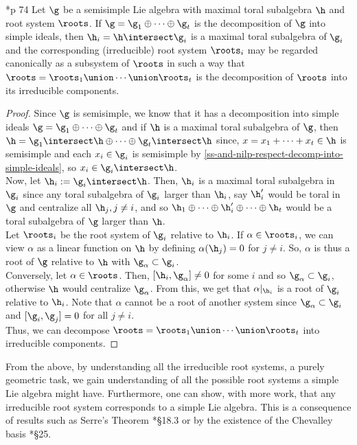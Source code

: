 \documentclass[11pt,leqno,oneside]{amsart}
\numberwithin{thm}{section}
\begin{document}
\begin{cor}
  \cite{humph}*{p 74} Let \(\g\) be a semisimple Lie algebra with
  maximal toral subalgebra 
  \(\h\) and root system \(\roots\). If \(\g = \g_1 \oplus \cdots
  \oplus \g_t\) is the decomposition of \(\g\) into simple ideals,
  then \(\h_i = \h \intersect \g_i\) is a maximal toral subalgebra of
  \(\g_i\) and the corresponding (irreducible) root system
  \(\roots_i\) may be regarded canonically as a subsystem of
  \(\roots\) in such a way that \(\roots = \roots_1 \union \cdots
  \union \roots_t\) is the decomposition of \(\roots\) into its
  irreducible components.
\end{cor}
\begin{proof}
  Since \(\g\) is semisimple, we know that it has a decomposition into
  simple ideals \(\g = \g_1 \oplus \cdots \oplus \g_t\) and if \(\h\)
  is a maximal toral subalgebra of \(\g\), then \(\h = \g_1
  \intersect \h \oplus \cdots \oplus \g_t \intersect \h\) since, \(x =
  x_1 + \cdots + x_t \in \h\) is 
  semisimple and each \(x_i \in \g_i\) is semisimple by \ref{ss-and-nilp-respect-decomp-into-simple-ideals}, so
  \(x_i \in \g_i \intersect \h\). \\

  Now, let \(\h_i := \g_i \intersect \h\). Then, \(\h_i\) is a maximal
  toral subalgebra in \(\g_i\) since any toral subalgebra of \(\g_i\)
  larger than \(\h_i\), say \(\h_i'\) would be toral in \(\g\) and
  centralize all 
  \(\h_j, j \neq i\), and so \(\h_1 \oplus \cdots \oplus \h_i' \oplus
  \cdots \oplus \h_t\) would be a toral subalgebra of \(\g\) larger
  than \(\h\). \\

  Let \(\roots_i\) be the root system of \(\g_i\) relative to
  \(\h_i\). If \(\alpha \in \roots_i\), we can view \(\alpha\) as a
  linear function on \(\h\) by defining \(\alpha(\h_j) = 0\) for \(j
  \neq i\). So, \(\alpha\) is thus a root of \(\g\) relative to \(\h\)
  with \(\g_\alpha \subset \g_i\). \\

  Conversely, let \(\alpha \in
  \roots\). Then, \([\h_i, \g_\alpha] \neq 0\) for some \(i\) and so
  \(\g_\alpha \subset \g_i\), otherwise \(\h\) would centralize
  \(\g_\alpha\). From this, we get that 
  \(\alpha|_{\h_i}\) is a root of \(\g_i\) relative to
  \(\h_i\). Note that \(\alpha\) cannot be a root of another system
  since \(\g_\alpha \subset \g_i\) and \([\g_i, \g_j] = 0\) for all
  \(j \neq i\). \\

  Thus, we can decompose \(\roots = \roots_1 \union \cdots \union
  \roots_t\) into irreducible components.
\end{proof}
From the above, by understanding all the irreducible root systems, a purely
geometric task, we gain understanding of all the possible root systems
a simple Lie algebra might have. Furthermore, one can show, with more
work, that any irreducible root system corresponds to a simple Lie
algebra. This is a consequence of results such as Serre's Theorem
\cite{humph}*{\S 18.3} or
by the existence of the Chevalley basis \cite{humph}*{\S 25}. 
\end{document}
